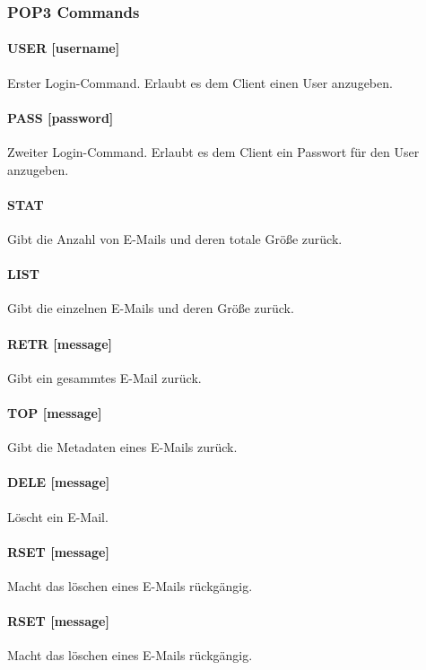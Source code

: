\documentclass[12pt, letterpaper]{article}
\begin{document}
\subsubsection{POP3 Commands}

\paragraph{USER [username]}
Erster Login-Command. Erlaubt es dem Client einen User anzugeben.

\paragraph{PASS [password]}
Zweiter Login-Command. Erlaubt es dem Client ein Passwort für den User anzugeben.

\paragraph{STAT}
Gibt die Anzahl von E-Mails und deren totale Größe zurück.

\paragraph{LIST}
Gibt die einzelnen E-Mails und deren Größe zurück.

\paragraph{RETR [message]}
Gibt ein gesammtes E-Mail zurück.

\paragraph{TOP [message]}
Gibt die Metadaten eines E-Mails zurück.

\paragraph{DELE [message]}
Löscht ein E-Mail.

\paragraph{RSET [message]}
Macht das löschen eines E-Mails rückgängig.

\paragraph{RSET [message]}
Macht das löschen eines E-Mails rückgängig.
\end{document}

